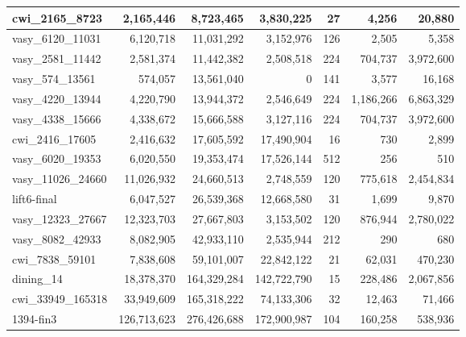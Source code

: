 \begin{table}[t]
\begin{tabular}{lrrrrrr}
cwi\_2165\_8723 & 2,165,446 & 8,723,465 & 3,830,225 & 27 & 4,256 & 20,880 \\ \hline
vasy\_6120\_11031 & 6,120,718 & 11,031,292 & 3,152,976 & 126 & 2,505 & 5,358 \\ \hline
vasy\_2581\_11442 & 2,581,374 & 11,442,382 & 2,508,518 & 224 & 704,737 & 3,972,600 \\ \hline
vasy\_574\_13561 & 574,057 & 13,561,040 & 0 & 141 & 3,577 & 16,168 \\ \hline
vasy\_4220\_13944 & 4,220,790 & 13,944,372 & 2,546,649 & 224 & 1,186,266 & 6,863,329 \\ \hline
vasy\_4338\_15666 & 4,338,672 & 15,666,588 & 3,127,116 & 224 & 704,737 & 3,972,600 \\ \hline
cwi\_2416\_17605 & 2,416,632 & 17,605,592 & 17,490,904 & 16 & 730 & 2,899 \\ \hline
vasy\_6020\_19353 & 6,020,550 & 19,353,474 & 17,526,144 & 512 & 256 & 510 \\ \hline
vasy\_11026\_24660 & 11,026,932 & 24,660,513 & 2,748,559 & 120 & 775,618 & 2,454,834 \\ \hline
lift6-final & 6,047,527 & 26,539,368 & 12,668,580 & 31 & 1,699 & 9,870 \\ \hline
vasy\_12323\_27667 & 12,323,703 & 27,667,803 & 3,153,502 & 120 & 876,944 & 2,780,022 \\ \hline
vasy\_8082\_42933 & 8,082,905 & 42,933,110 & 2,535,944 & 212 & 290 & 680 \\ \hline
cwi\_7838\_59101 & 7,838,608 & 59,101,007 & 22,842,122 & 21 & 62,031 & 470,230 \\ \hline
dining\_14 & 18,378,370 & 164,329,284 & 142,722,790 & 15 & 228,486 & 2,067,856 \\ \hline
cwi\_33949\_165318 & 33,949,609 & 165,318,222 & 74,133,306 & 32 & 12,463 & 71,466 \\ \hline
1394-fin3 & 126,713,623 & 276,426,688 & 172,900,987 & 104 & 160,258 & 538,936 \\ \hline
\end{tabular}
\label{tab:chars}
\end{table}
